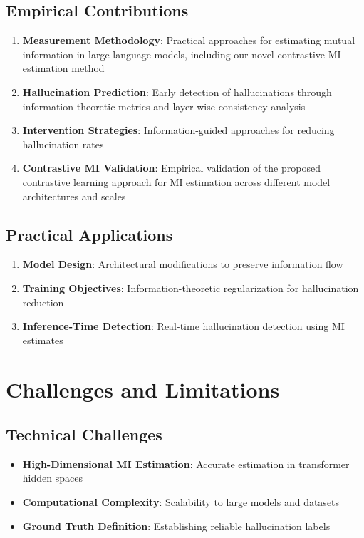 \subsection{Empirical Contributions}
\begin{enumerate}
    \item \textbf{Measurement Methodology}: Practical approaches for estimating mutual information in large language models, including our novel contrastive MI estimation method
    \item \textbf{Hallucination Prediction}: Early detection of hallucinations through information-theoretic metrics and layer-wise consistency analysis
    \item \textbf{Intervention Strategies}: Information-guided approaches for reducing hallucination rates
    \item \textbf{Contrastive MI Validation}: Empirical validation of the proposed contrastive learning approach for MI estimation across different model architectures and scales
\end{enumerate}

\subsection{Practical Applications}
\begin{enumerate}
    \item \textbf{Model Design}: Architectural modifications to preserve information flow
    \item \textbf{Training Objectives}: Information-theoretic regularization for hallucination reduction
    \item \textbf{Inference-Time Detection}: Real-time hallucination detection using MI estimates
\end{enumerate}

\section{Challenges and Limitations}
\label{sec:challenges}

\subsection{Technical Challenges}
\begin{itemize}
    \item \textbf{High-Dimensional MI Estimation}: Accurate estimation in transformer hidden spaces
    \item \textbf{Computational Complexity}: Scalability to large models and datasets
    \item \textbf{Ground Truth Definition}: Establishing reliable hallucination labels
\end{itemize}

